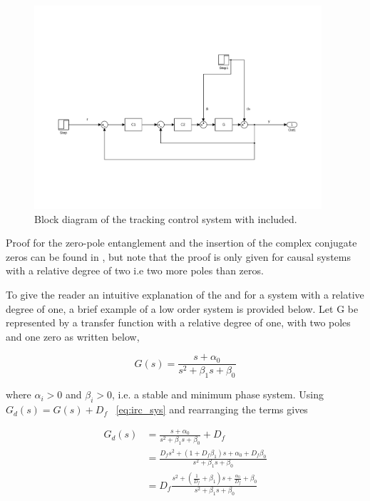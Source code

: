 \begin{figure}[h]
  \centering %
  \includegraphics[width=0.95\textwidth, trim=4cm 5cm 3.6cm 9.5cm, clip=true]{fig/matlab/irc_int}
  \caption{\label{fig:irc_int}Block diagram of the tracking control system with \abbrIRC included.}
\end{figure}

Proof for the zero-pole entanglement and the insertion of the complex conjugate zeros can be found in \citep{Aphale:2007}, but note that the proof is only given for causal systems with a relative degree of two i.e two more poles than zeros.

To give the reader an intuitive explanation of the \abbrIRC and for a system with a relative degree of one, a brief example of a low order system is provided below. Let G be represented by a transfer function with a relative degree of one, with two poles and one zero as written below,

\begin{equation}
  \label{eq:irc_sys}
  G(s) = \frac{s + \alpha_0}{s^2 + \beta_1s + \beta_0}
\end{equation}

where  $\alpha_i > 0$ and  $\beta_i > 0$, i.e. a stable and minimum phase system.  Using $G_d(s) = G(s) + D_f$  ~\eqref{eq:irc_sys} and rearranging the terms gives

\begin{equation}
  \label{eq:irc_sys_d}
  \begin{split}
  G_d(s) & = \frac{s + \alpha_0}{s^2 + \beta_1s + \beta_0} + D_f \\
      & = \frac{D_fs^2 + (1 + D_f\beta_1)s + \alpha_0 + D_f\beta_0}{s^2 + \beta_1s + \beta_0} \\
      & = D_f\frac{s^2 + (\frac{1}{D_f} + \beta_1)s + \frac{\alpha_0}{D_f} + \beta_0}{s^2 + \beta_1s + \beta_0}
  \end{split}
\end{equation}


